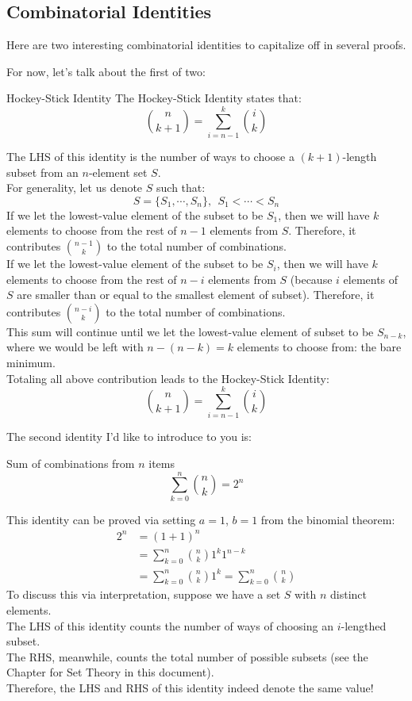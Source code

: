 \subsection{Combinatorial Identities}
Here are two interesting combinatorial identities to capitalize off in several proofs.

For now, let's talk about the first of two:
\begin{ln-define}{Hockey-Stick Identity}{}
    The Hockey-Stick Identity states that:
    \[\binom{n}{k + 1} = \sum_{i = n - 1}^k \binom{i}{k}\]
\end{ln-define}
The LHS of this identity is the number of ways to choose a $(k + 1)$-length subset from an $n$-element set $S$. \\
For generality, let us denote $S$ such that:
\[S = \{S_1, \cdots, S_n\},\ \ S_1 < \cdots < S_n\]
If we let the lowest-value element of the subset to be $S_1$, then we will have $k$ elements to choose from the rest of $n - 1$ elements from $S$. Therefore, it contributes $\binom{n - 1}{k}$ to the total number of combinations. \\
If we let the lowest-value element of the subset to be $S_i$, then we will have $k$ elements to choose from the rest of $n - i$ elements from $S$ (because $i$ elements of $S$ are smaller than or equal to the smallest element of subset). Therefore, it contributes $\binom{n - i}{k}$ to the total number of combinations. \\
This sum will continue until we let the lowest-value element of subset to be $S_{n - k}$, where we would be left with $n - (n - k) = k$ elements to choose from: the bare minimum. \\
Totaling all above contribution leads to the Hockey-Stick Identity:
\[\binom{n}{k + 1} = \sum_{i = n - 1}^k \binom{i}{k}\]

The second identity I'd like to introduce to you is:
\begin{ln-define}{Sum of combinations from $n$ items}{}
    \[\sum_{k = 0}^n \binom{n}{k} = 2^n\]
\end{ln-define}
This identity can be proved via setting $a = 1$, $b = 1$ from the binomial theorem:
\begin{align*}
    2^n &= (1 + 1)^n \\
    &= \sum_{k = 0}^n \binom{n}{k} {1}^k {1}^{n - k} \\
    &= \sum_{k = 0}^n \binom{n}{k} {1}^k = \sum_{k = 0}^n \binom{n}{k}
\end{align*}
To discuss this via interpretation, suppose we have a set $S$ with $n$ distinct elements. \\
The LHS of this identity counts the number of ways of choosing an $i$-lengthed subset. \\
The RHS, meanwhile, counts the total number of possible subsets (see the Chapter for Set Theory in this document). \\
Therefore, the LHS and RHS of this identity indeed denote the same value!

